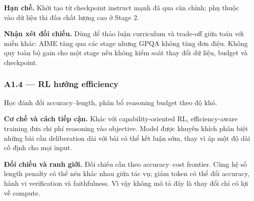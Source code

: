 \noindent\textbf{Hạn chế.} Khởi tạo từ checkpoint instruct mạnh đã qua căn chỉnh; phụ thuộc vào dữ liệu thi đấu chất lượng cao ở Stage 2.\par
\begin{samepage}
\noindent\textbf{Nhận xét đối chiếu.} Dùng để thảo luận curriculum và trade-off giữa toán với miền khác: AIME tăng qua các stage nhưng GPQA không tăng đơn điệu. Không quy toàn bộ gain cho một stage nếu không kiểm soát thay đổi dữ liệu, budget và checkpoint.\par
{}
\end{samepage}

\subsubsection*{A1.4 — RL hướng efficiency}
Học đánh đổi accuracy–length, phân bổ reasoning budget theo độ khó.

\noindent\textbf{Cơ chế và cách tiếp cận.} Khác với capability-oriented RL, efficiency-aware training đưa chi phí reasoning vào objective. Model được khuyến khích phân biệt những bài cần deliberation dài với bài có thể kết luận sớm, thay vì áp một độ dài cố định cho mọi input.\par
\noindent\textbf{Đối chiếu và ranh giới.} Đối chiếu cần theo accuracy–cost frontier. Cùng hệ số length penalty có thể nén khác nhau giữa tác vụ; giảm token có thể đổi accuracy, hành vi verification và faithfulness. Vì vậy không mô tả đây là thay đổi chỉ có lợi về compute.\par

